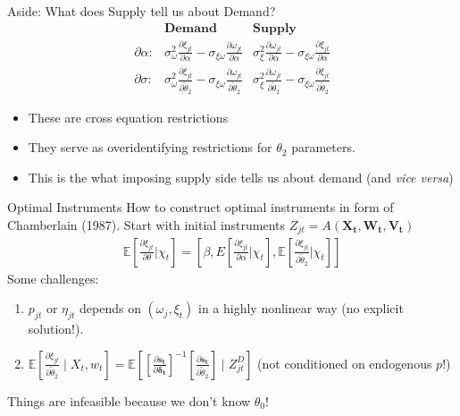 \documentclass[xcolor=pdftex,dvipsnames,table,mathserif,aspectratio=169]{beamer}
\newcommand{\del}{\partial}
\begin{document}
\begin{frame}{Aside: What does Supply tell us about Demand?}
\begin{align*}
& \textbf{Demand} & \textbf{Supply} \\
\del \alpha:& 
        \sigma_\omega^2 \frac{\partial \xi_{jt}}{\partial \alpha} - 
        \sigma_{\xi\omega}\frac{\partial \omega_{jt}}{\partial \alpha} 
        & \sigma_{\xi}^2 \frac{\partial \omega_{jt}}{\partial \alpha}  - 
        \sigma_{\xi\omega}\frac{\partial \xi_{jt}}{\partial \alpha}  \\
\del \sigma:& 
        \sigma_\omega^2 \frac{\partial \xi_{jt}}{\partial \widetilde{\theta}_2}  -
        \sigma_{\xi\omega}\frac{\partial \omega_{jt}}{\partial \widetilde{\theta}_2} 
        & \sigma_{\xi}^2 \frac{\partial \omega_{jt}}{\partial \widetilde{\theta}_2} - 
        \sigma_{\xi\omega}\frac{\partial \xi_{jt}}{\partial \widetilde{\theta}_2}
\end{align*}
\begin{itemize}
\item These are \alert{cross equation restrictions}
\item They serve as \alert{overidentifying restrictions} for $\theta_2$ parameters.
\item This is the what imposing supply side tells us about demand (and \textit{vice versa})
\end{itemize}
\end{frame}


\begin{frame}{Optimal Instruments}
How to construct optimal instruments in form of Chamberlain (1987). Start with initial instruments $Z_{jt}=A\left(\mathbf{X_t},\mathbf{W_t},\mathbf{V_t}\right)$
\begin{eqnarray*}
\mathbb{E}\left[\frac{\partial \xi_{jt}}{\partial \theta} | \chi_{t} \right] = \left[\beta, E\left[\frac{\partial \xi_{jt}}{\partial \alpha} | \chi_{t} \right] ,
 \mathbb{E}\left[\frac{\partial \xi_{jt}}{\partial \widetilde{\theta}_2} | \chi_{t} \right] \right]
\end{eqnarray*}
Some challenges:
\begin{enumerate}
\item $p_{jt}$ or $\eta_{jt}$ depends on $(\omega_{j},\xi_{t})$ in a highly nonlinear way (no explicit solution!).
\item $\mathbb{E}\left[\frac{\partial \xi_{jt}}{\partial \widetilde{\theta}_2} \mid X_t, w_{t} \right] =\mathbb{E}\left[\left[\frac{\partial \mathbf{s_t}}{\partial \mathbf{\delta_t}}\right]^{-1} 
\left[\frac{\partial \mathbf{s_t}}{\partial \widetilde{\theta}_2}\right] \mid Z_{jt}^D \right]$  (not conditioned on endogenous $p$!)
\end{enumerate}
Things are \alert{infeasible} because we don't know $\theta_0$!
\end{frame}
\end{document}
